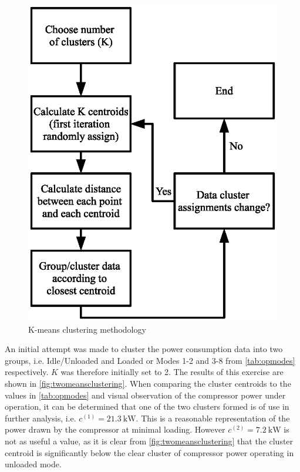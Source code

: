 \begin{figure}
\includegraphics[width = .9\columnwidth]{./Images/ClusteringOverview.eps}
\caption{K-means clustering methodology}
\label{fig:clusteroverview}
\end{figure}

An initial attempt was made to cluster the power consumption data into two groups, i.e. Idle/Unloaded and Loaded or Modes 1-2 and 3-8 from \autoref{tab:opmodes} respectively. $K$ was therefore initially set to 2. The results of this exercise are shown in \autoref{fig:twomeansclustering}. When comparing the cluster centroids to the values in \autoref{tab:opmodes} and visual observation of the compressor power under operation, it can be determined that one of the two clusters formed is of use in further analysis, i.e. $c^{(1)} = \SI{21.3}{\kilo \watt}.$ This is a reasonable representation of the power drawn by the compressor at minimal loading. However $c^{(2)} = \SI{7.2}{\kilo \watt}$ is not as useful a value, as it is clear from \autoref{fig:twomeansclustering} that the cluster centroid is significantly below the clear cluster of compressor power operating in unloaded mode.

